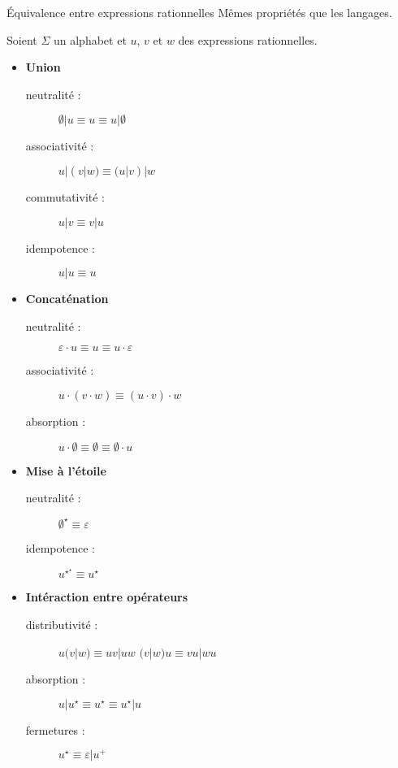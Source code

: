 
\begingroup

\begin{frame}{Équivalence entre expressions rationnelles}
  Mêmes propriétés que les langages.
  
  Soient $\Sigma$ un alphabet et $u$, $v$ et $w$ des expressions rationnelles. 
 
  \begin{itemize}
  \item \textbf{Union} 
    \begin{description}
    \item[neutralité :] $\emptyset | u \equiv u \equiv u | \emptyset$ 
    \item[associativité :] $u | (v | w) \equiv (u | v) | w$ \hspace{5mm}  
    \item[commutativité :] $u | v \equiv v | u$
    \item[idempotence :] $u | u \equiv u$
    \end{description}
  \item \textbf{Concaténation} 
    \begin{description}
    \item[neutralité :] $\varepsilon \cdot u \equiv u \equiv u \cdot \varepsilon$
    \item[associativité :] $u \cdot (v \cdot w) \equiv (u \cdot v) \cdot w$  \hspace{5mm} 
    \item[absorption :] $u \cdot \emptyset \equiv \emptyset \equiv \emptyset \cdot u$
    \end{description}
  \item \textbf{Mise à l'étoile} 
    \begin{description}
    \item[neutralité :] $\emptyset^\star \equiv \varepsilon$
    \item[idempotence :] $u^{\star^\star} \equiv u^\star$
    \end{description}
  \item \textbf{Intéraction entre opérateurs} 
    \begin{description}
    \item[distributivité :] $u (v | w) \equiv uv | uw$ \hspace{5mm}  \hspace{5mm} $(v | w) u \equiv vu | wu$
    \item[absorption :] $u | u^\star \equiv u^\star \equiv u^\star | u$
    \item[fermetures :] $u^\star \equiv \varepsilon | u^+$
    \end{description}
  \end{itemize}
\end{frame}


\endgroup
